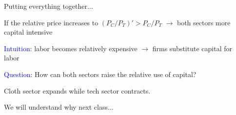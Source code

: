 \documentclass[notes,11pt, aspectratio=169, xcolor=table]{beamer}
\newcommand{\blue}[1]{\textcolor{blue}{#1}}
\newenvironment{wideitemize}{\itemize\addtolength{\itemsep}{10pt}}{\enditemize}
\begin{document}
\begin{frame}{Putting everything together...}

        \begin{wideitemize}
            \item If the relative price increases to $(P_C / P_T)' > P_C / P_T$ $\rightarrow$ both sectors more capital intensive

            \item<2-> \blue{Intuition}:  labor becomes relatively expensive $\rightarrow$ firms substitute capital for labor

            \item<3-> \blue{Question}: How can both sectors raise the relative use of capital?

            \item<4-> Cloth sector expands while tech sector contracts.

            \item<4-> We will understand why next class...

\end{wideitemize}
\end{frame}
\end{document}
